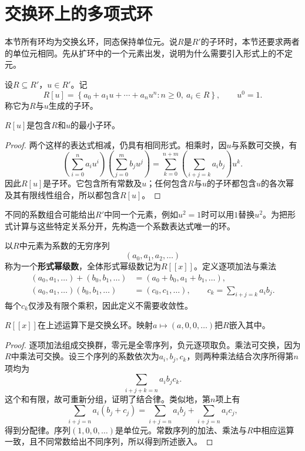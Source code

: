 \section{交换环上的多项式环}

本节所有环均为交换幺环，同态保持单位元。说$R$是$R'$的子环时，本节还要求两者的单位元相同。先从扩环中的一个元素出发，说明为什么需要引入形式上的不定元。

\begin{definition}
设$R\subseteq R'$，$u\in R'$。记
\[
R[u]=\left\{a_0+a_1u+\cdots+a_nu^n:n\ge0,\ a_i\in R\right\},
\qquad u^0=1.
\]
称它为$R$与$u$生成的子环。
\end{definition}
\begin{proposition}
$R[u]$是包含$R$和$u$的最小子环。
\end{proposition}
\begin{proof}
两个这样的表达式相减，仍具有相同形式。相乘时，因$u$与系数可交换，有
\[
\left(\sum_{i=0}^n a_i u^i\right)
\left(\sum_{j=0}^m b_j u^j\right)
=\sum_{k=0}^{n+m}\left(\sum_{i+j=k}a_i b_j\right)u^k.
\]
因此$R[u]$是子环。它包含所有常数及$u$；任何包含$R$与$u$的子环都包含$u$的各次幂及其有限线性组合，所以都包含$R[u]$。
\end{proof}

不同的系数组合可能给出$R'$中同一个元素，例如$u^2=1$时可以用$1$替换$u^2$。为把形式计算与这些特定关系分开，先构造一个系数表达式唯一的环。

\begin{definition}
以$R$中元素为系数的无穷序列
\[
(a_0,a_1,a_2,\ldots)
\]
称为一个\textbf{形式幂级数}，全体形式幂级数记为$R[[x]]$。定义逐项加法与乘法
\begin{align*}
(a_0,a_1,\ldots)+(b_0,b_1,\ldots)&=(a_0+b_0,a_1+b_1,\ldots),\\
(a_0,a_1,\ldots)(b_0,b_1,\ldots)&=(c_0,c_1,\ldots),
\qquad c_k=\sum_{i+j=k}a_i b_j.
\end{align*}
每个$c_k$仅涉及有限个乘积，因此定义不需要收敛性。
\end{definition}

\begin{proposition}
$R[[x]]$在上述运算下是交换幺环。映射$a\mapsto(a,0,0,\ldots)$把$R$嵌入其中。
\end{proposition}
\begin{proof}
逐项加法组成交换群，零元是全零序列，负元逐项取负。乘法可交换，因为$R$中乘法可交换。设三个序列的系数依次为$a_i,b_j,c_k$，则两种乘法结合次序所得第$n$项均为
\[
\sum_{i+j+k=n}a_i b_j c_k.
\]
这个和有限，故可重新分组，证明了结合律。类似地，第$n$项上有
\[
\sum_{i+j=n}a_i(b_j+c_j)
=\sum_{i+j=n}a_i b_j+\sum_{i+j=n}a_i c_j,
\]
得到分配律。序列$(1,0,0,\ldots)$是单位元。常数序列的加法、乘法与$R$中相应运算一致，且不同常数给出不同序列，所以得到所述嵌入。
\end{proof}

